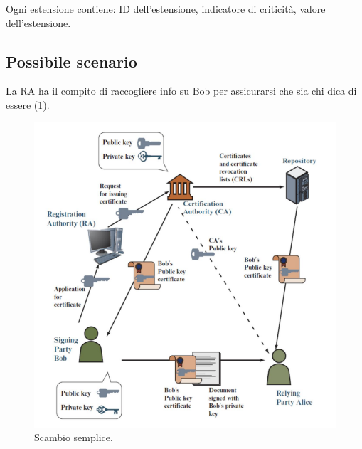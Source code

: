 Ogni estensione contiene: ID dell'estensione, indicatore di criticità, valore dell'estensione.

\subsection{Possibile scenario}
La RA ha il compito di raccogliere info su Bob per assicurarsi che sia chi dica di essere (\ref{fig:3-5}).

\begin{figure}
    \centering
    \includegraphics[width=1\textwidth]{images/chapter3/3-5.png}
    \caption{Scambio semplice.}
    \label{fig:3-5}
\end{figure}